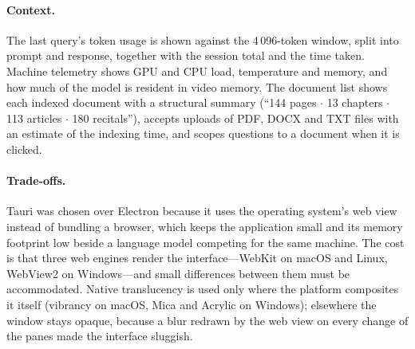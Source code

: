 \paragraph{Context.} The last query's token usage is shown against the
4\,096-token window, split into prompt and response, together with the
session total and the time taken. Machine telemetry shows GPU and CPU load,
temperature and memory, and how much of the model is resident in video
memory. The document list shows each indexed document with a structural
summary (``144 pages $\cdot$ 13 chapters $\cdot$ 113 articles $\cdot$ 180
recitals''), accepts uploads of PDF, DOCX and TXT files with an estimate of
the indexing time, and scopes questions to a document when it is clicked.

\paragraph{Trade-offs.} Tauri was chosen over Electron because it uses the
operating system's web view instead of bundling a browser, which keeps the
application small and its memory footprint low beside a language model
competing for the same machine. The cost is that three web engines render the
interface---WebKit on macOS and Linux, WebView2 on Windows---and small
differences between them must be accommodated. Native translucency is used
only where the platform composites it itself (vibrancy on macOS, Mica and
Acrylic on Windows); elsewhere the window stays opaque, because a blur
redrawn by the web view on every change of the panes made the interface
sluggish.
